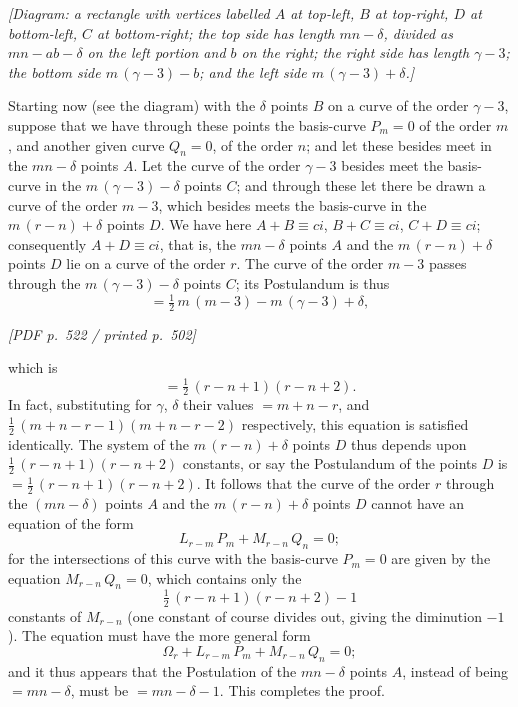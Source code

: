 \documentclass[11pt]{article}
\begin{document}
\medskip

\noindent\textit{[Diagram: a rectangle with vertices labelled $A$ at top-left, $B$ at top-right, $D$ at bottom-left, $C$ at bottom-right; the top side has length $mn - \delta$, divided as $mn - ab - \delta$ on the left portion and $b$ on the right; the right side has length $\gamma - 3$; the bottom side $m\,(\gamma - 3) - b$; and the left side $m\,(\gamma - 3) + \delta$.]}

\medskip

\noindent Starting now (see the diagram) with the $\delta$ points $B$ on a curve of the order $\gamma - 3$, suppose that we have through these points the basis-curve $P_{m} = 0$ of the order $m$, and another given curve $Q_{n} = 0$, of the order $n$; and let these besides meet in the $mn - \delta$ points $A$. Let the curve of the order $\gamma - 3$ besides meet the basis-curve in the $m\,(\gamma - 3) - \delta$ points $C$; and through these let there be drawn a curve of the order $m - 3$, which besides meets the basis-curve in the $m\,(r - n) + \delta$ points $D$. We have here $A + B \equiv ci$, $B + C \equiv ci$, $C + D \equiv ci$; consequently $A + D \equiv ci$, that is, the $mn - \delta$ points $A$ and the $m\,(r - n) + \delta$ points $D$ lie on a curve of the order $r$. The curve of the order $m - 3$ passes through the $m\,(\gamma - 3) - \delta$ points $C$; its Postulandum is thus
\[
= \tfrac{1}{2}\,m\,(m - 3) - m\,(\gamma - 3) + \delta,
\]

\vfill
\noindent\textit{[PDF p.~522 / printed p.~502]}
\newpage

\noindent which is
\[
= \tfrac{1}{2}\,(r - n + 1)(r - n + 2).
\]
In fact, substituting for $\gamma$, $\delta$ their values $= m + n - r$, and $\tfrac{1}{2}\,(m + n - r - 1)(m + n - r - 2)$ respectively, this equation is satisfied identically. The system of the $m\,(r - n) + \delta$ points $D$ thus depends upon $\tfrac{1}{2}\,(r - n + 1)(r - n + 2)$ constants, or say the Postulandum of the points $D$ is $= \tfrac{1}{2}\,(r - n + 1)(r - n + 2)$. It follows that the curve of the order $r$ through the $(mn - \delta)$ points $A$ and the $m\,(r - n) + \delta$ points $D$ cannot have an equation of the form
\[
L_{r-m}\,P_{m} + M_{r-n}\,Q_{n} = 0;
\]
for the intersections of this curve with the basis-curve $P_{m} = 0$ are given by the equation $M_{r-n}\,Q_{n} = 0$, which contains only the
\[
\tfrac{1}{2}\,(r - n + 1)(r - n + 2) - 1
\]
constants of $M_{r-n}$ (one constant of course divides out, giving the diminution $-1$). The equation must have the more general form
\[
\Omega_{r} + L_{r-m}\,P_{m} + M_{r-n}\,Q_{n} = 0;
\]
and it thus appears that the Postulation of the $mn - \delta$ points $A$, instead of being $= mn - \delta$, must be $= mn - \delta - 1$. This completes the proof.
\end{document}
